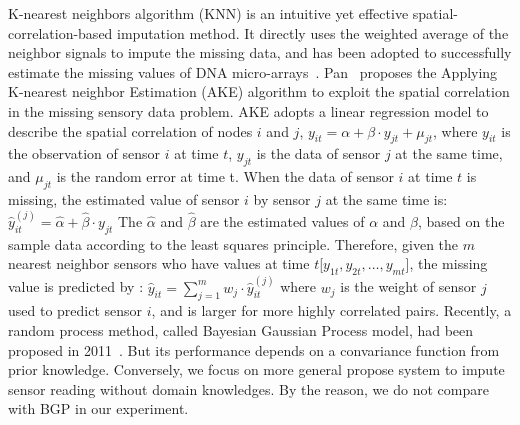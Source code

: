 K-nearest neighbors algorithm (KNN) is an intuitive yet effective spatial-correlation-based imputation method. 
It directly uses the weighted average of the neighbor signals to impute the missing data, and has been adopted to successfully 
estimate the missing values of DNA micro-arrays~\cite{Troyanskaya:DNAKNN}.  
Pan~\cite{pan2010k} proposes the Applying K-nearest neighbor Estimation (AKE) algorithm to exploit the spatial correlation in the 
missing sensory data problem. 
AKE adopts a linear regression model to describe the spatial correlation of nodes $i$ and $j$,
$y_{it} = \alpha + \beta\cdot y_{jt} + \mu_{jt} $,
where $y_{it}$ is the observation of sensor $i$ at time $t$, $y_{jt}$ is the data of sensor $j$ at the same time, 
and $\mu_{jt}$ is the random error at time t.   
When the data of sensor $i$ at time $t$ is missing, the estimated value of sensor $i$ by sensor $j$ at the same time is:
$\hat{y}_{it}^{(j)} =\hat{\alpha} +\hat{\beta}\cdot y_{jt}$
The $\hat{\alpha}$ and $\hat{\beta}$ are the estimated values of $\alpha$ and $\beta$, based on the sample data according to the least squares principle.
Therefore, given the $m$ nearest neighbor sensors who have values at time $t$[$y_{1t}, y_{2t},\dots, y_{mt}$], the missing value is predicted by :   
$ \hat{y}_{it} =\sum_{j=1}^m w_j \cdot \hat{y}_{it}^{(j)}$
%
where $w_j$ is the weight of sensor $j$ used to predict sensor $i$, and is larger for more highly correlated pairs.
Recently, a random process method,  called Bayesian Gaussian Process model, had been proposed in 2011~\cite{Osborne2011}. But its performance depends on a convariance function from prior knowledge. Conversely, we focus on more general propose system to impute sensor reading without domain knowledges. By the reason, we do not compare with BGP in our experiment.

